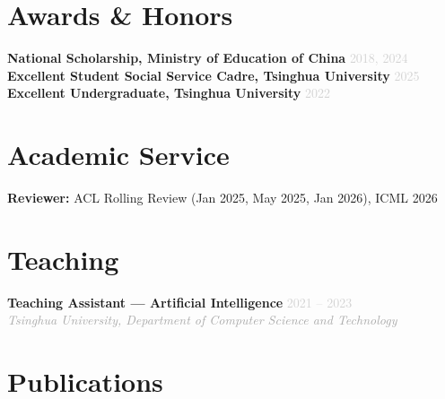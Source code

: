 \documentclass[11pt, a4paper]{article}
\newcommand{\cventry}[4]{%
    \noindent\textbf{#1} \hfill \textcolor{lightgray}{\small #2} \\
    \textit{\textcolor{darkgray}{#3}} \hfill \textcolor{lightgray}{\small #4} \\[-0.3em]
}
\newcommand{\cventryoneline}[2]{%
    \noindent\textbf{#1} \hfill \textcolor{lightgray}{\small #2} \\[-0.3em]
}
\begin{document}
\vspace{-0.8em}

\section{Awards \& Honors}

\cventryoneline{National Scholarship, Ministry of Education of China}{2018, 2024}
\cventryoneline{Excellent Student Social Service Cadre, Tsinghua University}{2025}
\cventryoneline{Excellent Undergraduate, Tsinghua University}{2022}

\vspace{-0.8em}


\section{Academic Service}

\noindent\textbf{Reviewer:} ACL Rolling Review (Jan 2025, May 2025, Jan 2026), ICML 2026


\section{Teaching}

\cventry{Teaching Assistant --- Artificial Intelligence}{2021 -- 2023}{Tsinghua University, Department of Computer Science and Technology}{}

\vspace{-0.8em}


\section{Publications}
\end{document}
